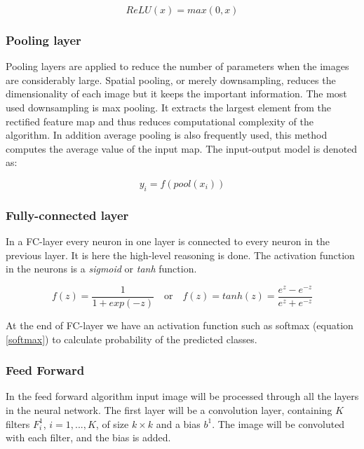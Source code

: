 \documentclass[english, a4paper]{report}
\begin{document}
\begin{equation} %
    ReLU(x) = max(0, x)
    \label{relu_func}
\end{equation}


\subsubsection{Pooling layer}
Pooling layers are applied to reduce the number of parameters when the images are considerably large. Spatial pooling, or merely downsampling, reduces the dimensionality of each image but it keeps the important information. The most used downsampling is max pooling. It extracts the largest element from the rectified feature map and thus reduces computational complexity of the algorithm. In addition average pooling is also frequently used, this method computes the average value of the input map. The input-output model is denoted as:

\begin{equation} %
  y_i = f(pool(x_i))
  \label{pool_func}
\end{equation}


\subsubsection{Fully-connected layer}
In a FC-layer every neuron in one layer is connected to every neuron in the previous layer. It is here the high-level reasoning is done. The activation function in the neurons is a \textit{sigmoid} or \textit{tanh} function.

\begin{equation} %
  f(z) = \frac{1}{1+exp(-z)} \quad \text{or} \quad f(z) = tanh(z) = \frac{e^{z} - e^{-z}}{e^{z} + e^{-z}}
\end{equation}

At the end of FC-layer we have an activation function such as softmax (equation \ref{softmax}) to calculate probability of the predicted classes.


\subsubsection{Feed Forward}
In the feed forward algorithm input image will be processed through all the layers in the neural network. The first layer will be a convolution layer, containing $K$ filters $F_i^1$, $i= 1, ..., K$, of size $k \times k$ and a bias $b^1$. The image will be convoluted with each filter, and the bias is added. 
\end{document}
